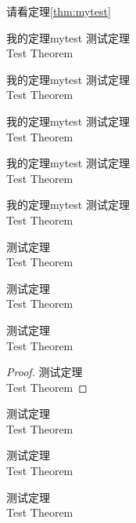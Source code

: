 \documentclass[cn,noanswer]{../../styles/book/elegantbook/elegantbook}
\begin{document}
请看定理\ref{thm:mytest}

\begin{theorem}{我的定理}{mytest}
测试定理 \\
Test Theorem
\end{theorem}

\begin{definition}{我的定理}{mytest}
测试定理 \\
Test Theorem
\end{definition}

\begin{lemma}{我的定理}{mytest}
测试定理 \\
Test Theorem
\end{lemma}

\begin{corollary}{我的定理}{mytest}
测试定理 \\
Test Theorem
\end{corollary}

\begin{proposition}{我的定理}{mytest}
测试定理 \\
Test Theorem
\end{proposition}

\begin{example}
测试定理 \\
Test Theorem
\end{example}

\begin{exercise}
测试定理 \\
Test Theorem
\end{exercise}

\begin{problem}
测试定理 \\
Test Theorem
\end{problem}

\begin{proof}
测试定理 \\
Test Theorem
\end{proof}

\begin{note}
测试定理 \\
Test Theorem
\end{note}

\begin{conclusion}
测试定理 \\
Test Theorem
\end{conclusion}


\begin{assumption}
测试定理 \\
Test Theorem
\end{assumption}
\end{document}
